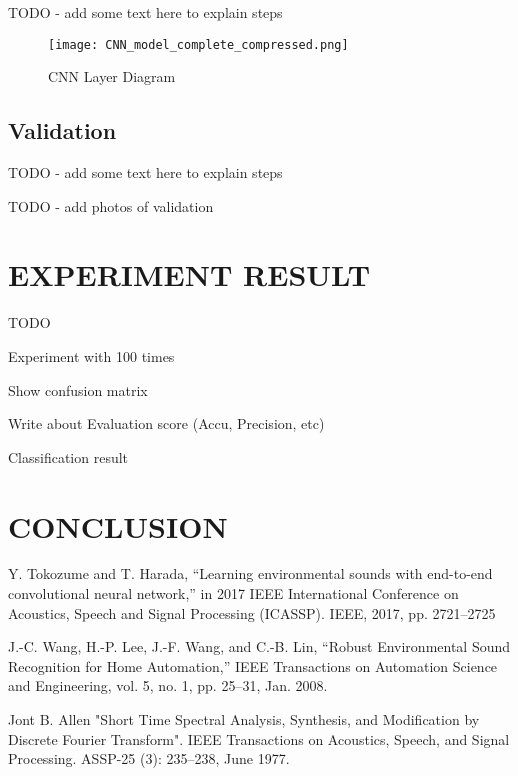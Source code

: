 \documentclass[conference]{IEEEtran}
\begin{document}
\begin{tabular}{||c c c c||} 

\end{tabular}

TODO - add some text here to explain steps

\begin{figure}[htbp]
\centerline{\texttt{[image: CNN\_model\_complete\_compressed.png]}}
\caption{CNN Layer Diagram}
\label{fig_CNN}
\end{figure}

\subsection{Validation}

TODO - add some text here to explain steps

TODO - add photos of validation


\section{EXPERIMENT RESULT}


TODO 

Experiment with 100 times

Show confusion matrix 

Write about Evaluation score (Accu, Precision, etc)

Classification result


\section{CONCLUSION}



\begin{thebibliography}{00}
 Y. Tokozume and T. Harada, “Learning environmental sounds with end-to-end convolutional neural network,” in 2017 IEEE International Conference on Acoustics, Speech and Signal Processing (ICASSP). IEEE, 2017, pp. 2721–2725 

 J.-C. Wang, H.-P. Lee, J.-F. Wang, and C.-B. Lin, “Robust Environmental Sound Recognition for Home Automation,” IEEE Transactions on Automation Science and Engineering, vol. 5, no. 1, pp. 25–31, Jan. 2008.



  Jont B. Allen "Short Time Spectral Analysis, Synthesis, and Modification by Discrete Fourier Transform". IEEE Transactions on Acoustics, Speech, and Signal Processing. ASSP-25 (3): 235–238, June 1977.


\end{thebibliography}
\end{document}
